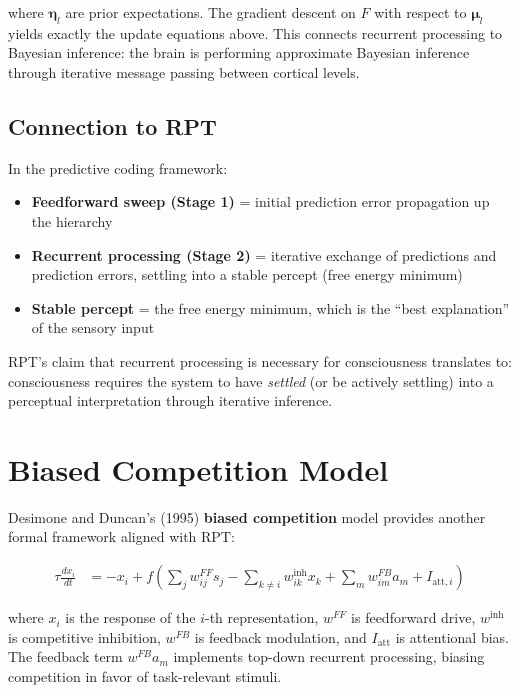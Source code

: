 \documentclass[11pt,a4paper]{report}
\begin{document}
where $\boldsymbol{\eta}_l$ are prior expectations. The gradient descent on $F$ with respect to $\boldsymbol{\mu}_l$ yields exactly the update equations above. This connects recurrent processing to Bayesian inference: the brain is performing approximate Bayesian inference through iterative message passing between cortical levels.

\subsection{Connection to RPT}

In the predictive coding framework:
\begin{itemize}[leftmargin=1.5em]
  \item \textbf{Feedforward sweep (Stage 1)} = initial prediction error propagation up the hierarchy
  \item \textbf{Recurrent processing (Stage 2)} = iterative exchange of predictions and prediction errors, settling into a stable percept (free energy minimum)
  \item \textbf{Stable percept} = the free energy minimum, which is the ``best explanation'' of the sensory input
\end{itemize}

RPT's claim that recurrent processing is necessary for consciousness translates to: consciousness requires the system to have \emph{settled} (or be actively settling) into a perceptual interpretation through iterative inference.

\section{Biased Competition Model}

Desimone and Duncan's (1995) \textbf{biased competition} model provides another formal framework aligned with RPT:

\begin{mathbox}
\vspace{-6pt}
\begin{align}
  \tau \frac{dx_i}{dt} &= -x_i + f\!\left(\sum_j w_{ij}^{FF} s_j - \sum_{k \neq i} w_{ik}^{\text{inh}} x_k + \sum_m w_{im}^{FB} a_m + I_{\text{att},i}\right)
\end{align}
\vspace{-8pt}
\end{mathbox}

where $x_i$ is the response of the $i$-th representation, $w^{FF}$ is feedforward drive, $w^{\text{inh}}$ is competitive inhibition, $w^{FB}$ is feedback modulation, and $I_{\text{att}}$ is attentional bias. The feedback term $w^{FB} a_m$ implements top-down recurrent processing, biasing competition in favor of task-relevant stimuli.
\end{document}

